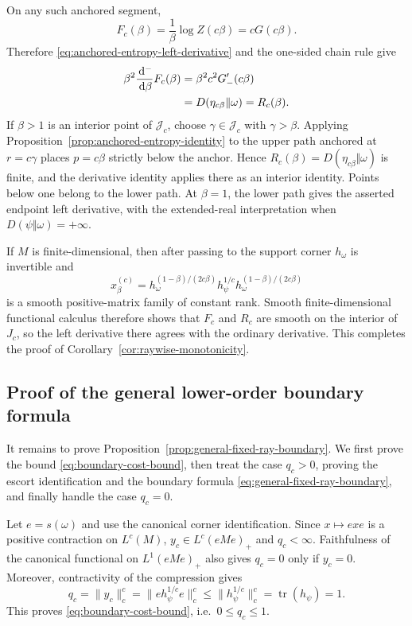 \documentclass[12pt]{article}
\numberwithin{equation}{section}
\theoremstyle{definition}
\theoremstyle{remark}
\newcommand{\dd}{\,\mathrm d}
\newcommand{\?}{\overset{?}{=}}
\DeclareMathOperator{\tr}{tr}
\begin{document}
On any such anchored segment,
\begin{equation}
  F_c(\beta)
  =
  \frac1\beta\log Z(c\beta)
  =
  cG(c\beta).
  \label{eq:fixed-ray-potential-from-anchor}
\end{equation}
Therefore \eqref{eq:anchored-entropy-left-derivative} and the one-sided
chain rule give
\begin{align}
  \beta^2\frac{\dd^-}{\dd\beta}F_c(\beta)
  &=
  \beta^2c^2G'_-(c\beta)\notag\\
  &=
  D(\eta_{c\beta}\Vert\omega)
  =
  R_c(\beta).
\end{align}
If \(\beta>1\) is an interior point of \(\mathcal J_c\), choose
\(\gamma\in\mathcal J_c\) with \(\gamma>\beta\).  Applying
Proposition~\ref{prop:anchored-entropy-identity} to the upper path anchored at \(r=c\gamma\) places
\(p=c\beta\) strictly below the anchor.  Hence
\(R_c(\beta)=D(\eta_{c\beta}\Vert\omega)\) is finite, and the derivative
identity applies there as an interior identity.
Points below one belong to the lower path.  At
$\beta=1$, the lower path gives the asserted endpoint left derivative,
with the extended-real interpretation when
$D(\psi\Vert\omega)=+\infty$.  

If \(M\) is finite-dimensional, then after passing to the support
corner \(h_\omega\) is invertible and
\[
  x_\beta^{(c)}
  =
  h_\omega^{(1-\beta)/(2c\beta)}
  h_\psi^{1/c}
  h_\omega^{(1-\beta)/(2c\beta)}
\]
is a smooth positive-matrix family of constant rank. Smooth
finite-dimensional functional calculus therefore shows that
\(F_c\) and \(R_c\) are smooth on the interior of \(J_c\), so the
left derivative there agrees with the ordinary derivative.
This completes the proof of
Corollary~\ref{cor:raywise-monotonicity}.

\subsection{Proof of the general lower-order boundary formula}
\label{subsec:lower-order-proof}

It remains to prove Proposition~\ref{prop:general-fixed-ray-boundary}.
We first prove the bound \eqref{eq:boundary-cost-bound}, 
then treat the case \(q_c>0\), proving
the escort identification and the boundary 
formula \eqref{eq:general-fixed-ray-boundary}, and finally
handle the case \(q_c=0\).

Let $e=s(\omega)$ and use the canonical corner identification.  Since
$x\mapsto{exe}$ is a positive contraction on $L^c(M)$,
$y_c\in L^c(eMe)_+$ and $q_c<\infty$.  Faithfulness of the canonical
functional on $L^1(eMe)_+$ also gives $q_c=0$ only if $y_c=0$.
Moreover, contractivity of the compression gives
\[
  q_c
  = \|y_c\|_c^c
  = \bigl\|e h_\psi^{1/c}e\bigr\|_c^c
  \leq \bigl\|h_\psi^{1/c}\bigr\|_c^c
  = \tr(h_\psi)
  = 1.
\]
This proves \eqref{eq:boundary-cost-bound}, i.e.\ \(0\leq q_c\leq1\).
\end{document}
